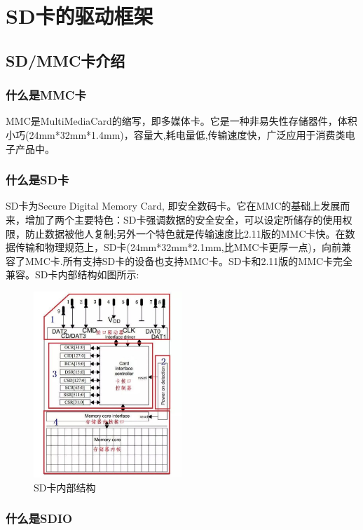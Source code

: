 \section{SD卡的驱动框架}

\subsection{SD/MMC卡介绍}

\subsubsection{什么是MMC卡}

MMC是MultiMediaCard的缩写，即多媒体卡。它是一种非易失性存储器件，体积小巧(24mm*32mm*1.4mm)，容量大,耗电量低,传输速度快，广泛应用于消费类电子产品中。

\subsubsection{什么是SD卡}

SD卡为Secure Digital Memory Card, 即安全数码卡。它在MMC的基础上发展而来，增加了两个主要特色：SD卡强调数据的安全安全，可以设定所储存的使用权限，防止数据被他人复制;另外一个特色就是传输速度比2.11版的MMC卡快。在数据传输和物理规范上，SD卡(24mm*32mm*2.1mm,比MMC卡更厚一点)，向前兼容了MMC卡.所有支持SD卡的设备也支持MMC卡。SD卡和2.11版的MMC卡完全兼容。SD卡内部结构如图所示:
\begin{figure}[H]
	\centering
	\includegraphics[width=0.5\textwidth]{figures/06-02-SD.jpg}
	\caption{SD卡内部结构}
\end{figure}

\subsubsection{什么是SDIO}

